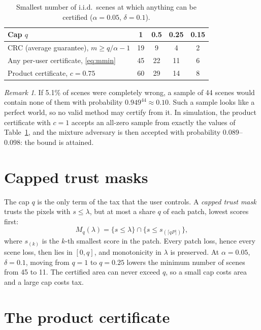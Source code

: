 \documentclass[11pt,a4paper]{article}
\theoremstyle{definition}
\theoremstyle{remark}
\newtheorem*{remark}{Remark}
\newcommand{\1}{\mathbf{1}}
\begin{document}
\begin{table}[htbp]
\centering
\caption{Smallest number of i.i.d.\ scenes at which anything can be certified ($\alpha=0.05$, $\delta=0.1$).}
\label{tab:budget}
\begin{tabular}{@{}lcccc@{}}
\toprule
Cap $q$ & 1 & 0.5 & 0.25 & 0.15\\
\midrule
CRC (average guarantee), $m\ge q/\alpha-1$ & 19 & 9 & 4 & 2\\
Any per-user certificate, \eqref{eq:mmin} & 45 & 22 & 11 & 6\\
Product certificate, $c=0.75$ & 60 & 29 & 14 & 8\\
\bottomrule
\end{tabular}
\end{table}

\begin{remark}
If 5.1\% of scenes were completely wrong, a sample of 44 scenes would contain none of them with probability $0.949^{44}\approx0.10$. Such a sample looks like a perfect world, so no valid method may certify from it. In simulation, the product certificate with $c=1$ accepts an all-zero sample from exactly the values of Table~\ref{tab:budget}, and the mixture adversary is then accepted with probability 0.089--0.098: the bound is attained.
\end{remark}

\section{Capped trust masks}

The cap $q$ is the only term of the tax that the user controls. A \emph{capped trust mask} trusts the pixels with $s\le\lambda$, but at most a share $q$ of each patch, lowest scores first:
\begin{equation}
M_q(\lambda)=\{s\le\lambda\}\cap\{s\le s_{(\lceil qP\rceil)}\},
\end{equation}
where $s_{(k)}$ is the $k$-th smallest score in the patch. Every patch loss, hence every scene loss, then lies in $[0,q]$, and monotonicity in $\lambda$ is preserved. At $\alpha=0.05$, $\delta=0.1$, moving from $q=1$ to $q=0.25$ lowers the minimum number of scenes from 45 to 11. The certified area can never exceed $q$, so a small cap costs area and a large cap costs tax.

\section{The product certificate}\label{sec:product}
\end{document}
